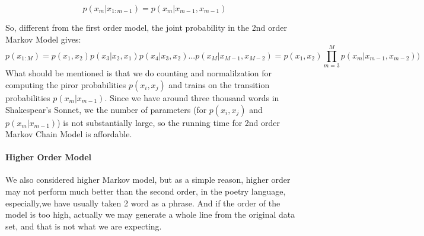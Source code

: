 \begin{equation}
  p(x_m|x_{1:m-1}) = p(x_m|x_{m-1}, x_{m-1})
\end{equation}

So, different from the first order model, the joint probability in the 2nd order Markov Model gives:
\begin{equation}
  p(x_{1:M}) =p(x_1, x_2)p(x_3|x_2, x_1)p(x_4|x_3, x_2) ...  p(x_M|x_{M-1}, x_{M-2}) = p(x_1, x_2) \prod\limits_{m=3}^M p(x_m|x_{m-1}, x_{m-2}))
\end{equation} 
What should be mentioned is that we do counting and normalilzation for computing the piror probabilities $p(x_i, x_j)$ and trains on the transition probabilities $p(x_m|x_{m-1})$. Since we have around three thousand words in Shakespear's Sonnet, we the number of parameters (for $p(x_i, x_j)$ and $p(x_m|x_{m-1})$) is not substantially large, so the running time for 2nd order Markov Chain Model is affordable.
\paragraph{Higher Order Model}
We also considered higher Markov model, but as a simple reason, higher order may not perform much better than the second order, in the poetry language, especially,we have usually taken 2 word as a phrase. And if the order of the model is too high, actually we may generate a whole line from the original data set, and that is not what we are expecting. 